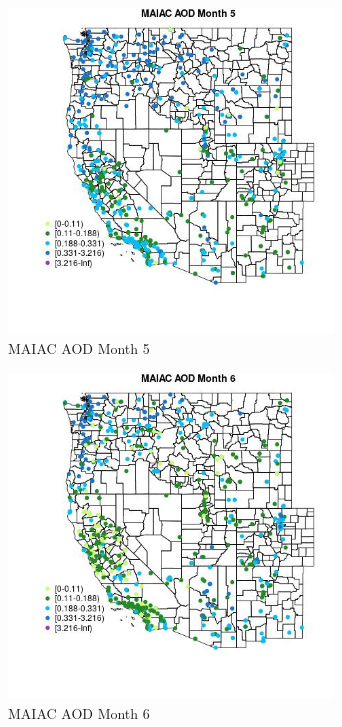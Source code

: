 \begin{figure} 
\centering  
\includegraphics[width=0.77\textwidth]{Code_Outputs/Report_ML_input_PM25_Step4_part_e_de_duplicated_aves_compiled_2019-05-14wNAs_MapObsMo5MAIAC_AOD.jpg} 
\caption{\label{fig:Report_ML_input_PM25_Step4_part_e_de_duplicated_aves_compiled_2019-05-14wNAsMapObsMo5MAIAC_AOD}MAIAC AOD Month 5} 
\end{figure} 
 

\begin{figure} 
\centering  
\includegraphics[width=0.77\textwidth]{Code_Outputs/Report_ML_input_PM25_Step4_part_e_de_duplicated_aves_compiled_2019-05-14wNAs_MapObsMo6MAIAC_AOD.jpg} 
\caption{\label{fig:Report_ML_input_PM25_Step4_part_e_de_duplicated_aves_compiled_2019-05-14wNAsMapObsMo6MAIAC_AOD}MAIAC AOD Month 6} 
\end{figure} 
 

